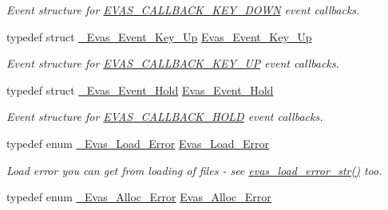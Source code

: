 \begin{DoxyCompactItemize}
\begin{DoxyCompactList}\small\item\em Event structure for \hyperlink{Evas_8h_a99e208e463a20499aabe6faac8a8cb8aa336b86bad4f145f84c155e4922335584}{EVAS\_\-CALLBACK\_\-KEY\_\-DOWN} event callbacks. \item\end{DoxyCompactList}\item 
typedef struct \hyperlink{struct__Evas__Event__Key__Up}{\_\-Evas\_\-Event\_\-Key\_\-Up} \hyperlink{Evas_8h_a92e77497752a3b100b3bfc4ee92daf09}{Evas\_\-Event\_\-Key\_\-Up}\label{Evas_8h_a92e77497752a3b100b3bfc4ee92daf09}

\begin{DoxyCompactList}\small\item\em Event structure for \hyperlink{Evas_8h_a99e208e463a20499aabe6faac8a8cb8aac436b50ad665089f8a24b0fb827cec5f}{EVAS\_\-CALLBACK\_\-KEY\_\-UP} event callbacks. \item\end{DoxyCompactList}\item 
typedef struct \hyperlink{struct__Evas__Event__Hold}{\_\-Evas\_\-Event\_\-Hold} \hyperlink{Evas_8h_a6fb6e5748f93fc24d62276e5421f9767}{Evas\_\-Event\_\-Hold}\label{Evas_8h_a6fb6e5748f93fc24d62276e5421f9767}

\begin{DoxyCompactList}\small\item\em Event structure for \hyperlink{Evas_8h_a99e208e463a20499aabe6faac8a8cb8aa585e05307b99c361e54df68a4f341a85}{EVAS\_\-CALLBACK\_\-HOLD} event callbacks. \item\end{DoxyCompactList}\item 
typedef enum \hyperlink{Evas_8h_ac6e5fe4a54ab26d2d9ceaefff0962b5f}{\_\-Evas\_\-Load\_\-Error} \hyperlink{Evas_8h_aff351ae694a58aecd7834ef12bdf3d64}{Evas\_\-Load\_\-Error}\label{Evas_8h_aff351ae694a58aecd7834ef12bdf3d64}

\begin{DoxyCompactList}\small\item\em Load error you can get from loading of files -\/ see \hyperlink{group__Evas__Utils_ga50bb423e88ce97cf82cca9b316fc7a1a}{evas\_\-load\_\-error\_\-str()} too. \item\end{DoxyCompactList}\item 
typedef enum \hyperlink{Evas_8h_a1adf9f604f763f2a8db12a484ca199cb}{\_\-Evas\_\-Alloc\_\-Error} \hyperlink{Evas_8h_ae0181b78df8e248703a72a978d271208}{Evas\_\-Alloc\_\-Error}\label{Evas_8h_ae0181b78df8e248703a72a978d271208}


\end{DoxyCompactItemize}
